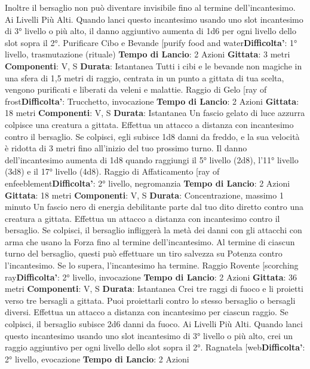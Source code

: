 \begin{multicols}{2}
Inoltre il bersaglio non può diventare invisibile fino al
termine dell’incantesimo.
Ai Livelli Più Alti. Quando lanci questo incantesimo
usando uno slot incantesimo di 3° livello o più alto, il
danno aggiuntivo aumenta di 1d6 per ogni livello dello
slot sopra il 2°.
Purificare Cibo e Bevande
[purify food and water\textbf{Difficolta'}:
1° livello, trasmutazione (rituale)
\textbf{Tempo di Lancio}: 2 Azioni
\textbf{Gittata}: 3 metri
\textbf{Componenti}: V, S
\textbf{Durata}: Istantanea
Tutti i cibi e le bevande non magiche in una sfera di 1,5
metri di raggio, centrata in un punto a gittata di tua
scelta, vengono purificati e liberati da veleni e malattie.
Raggio di Gelo
[ray of frost\textbf{Difficolta'}:
Trucchetto, invocazione
\textbf{Tempo di Lancio}: 2 Azioni
\textbf{Gittata}: 18 metri
\textbf{Componenti}: V, S
\textbf{Durata}: Istantanea
Un fascio gelato di luce azzurra colpisce una creatura a
gittata. Effettua un attacco a distanza con incantesimo
contro il bersaglio. Se colpisci, egli subisce 1d8 danni
da freddo, e la sua velocità è ridotta di 3 metri fino
all’inizio del tuo prossimo turno.
Il danno dell’incantesimo aumenta di 1d8 quando
raggiungi il 5° livello (2d8), l’11° livello (3d8) e il 17°
livello (4d8).
Raggio di Affaticamento
[ray of enfeeblement\textbf{Difficolta'}:
2° livello, negromanzia
\textbf{Tempo di Lancio}: 2 Azioni
\textbf{Gittata}: 18 metri
\textbf{Componenti}: V, S
\textbf{Durata}: Concentrazione, massimo 1 minuto
Un fascio nero di energia debilitante parte dal tuo dito
diretto contro una creatura a gittata. Effettua un attacco
a distanza con incantesimo contro il bersaglio. Se
colpisci, il bersaglio infliggerà la metà dei danni con gli
attacchi con arma che usano la Forza fino al termine
dell’incantesimo.
Al termine di ciascun turno del bersaglio, questi può
effettuare un tiro salvezza su Potenza contro
l’incantesimo. Se lo supera, l’incantesimo ha termine.
Raggio Rovente
[scorching ray\textbf{Difficolta'}:
2° livello, invocazione
\textbf{Tempo di Lancio}: 2 Azioni
\textbf{Gittata}: 36 metri
\textbf{Componenti}: V, S
\textbf{Durata}: Istantanea
Crei tre raggi di fuoco e li proietti verso tre bersagli a
gittata. Puoi proiettarli contro lo stesso bersaglio o
bersagli diversi.
Effettua un attacco a distanza con incantesimo per
ciascun raggio. Se colpisci, il bersaglio subisce 2d6
danni da fuoco.
Ai Livelli Più Alti. Quando lanci questo incantesimo
usando uno slot incantesimo di 3° livello o più alto, crei
un raggio aggiuntivo per ogni livello dello slot sopra il
2°.
Ragnatela
[web\textbf{Difficolta'}:
2° livello, evocazione
\textbf{Tempo di Lancio}: 2 Azioni

\end{multicols}
